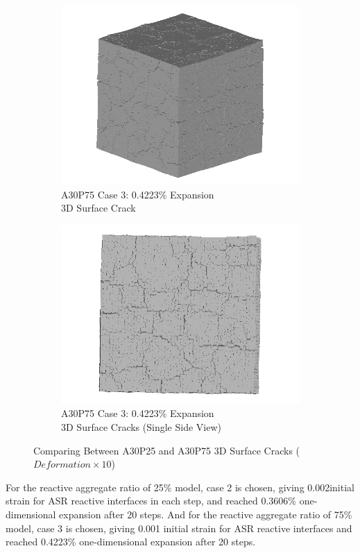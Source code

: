 \begin{figure}[ht!]
\begin{subfigure}{.5\textwidth}
    \end{subfigure}
    \begin{subfigure}{.5\textwidth}
      \centering
      \includegraphics[width=.8\linewidth]{Files/exp_3D/ASR/A30P75_3_3d.png}
    \caption{A30P75 Case 3: 0.4223\% Expansion\\ 3D Surface Crack}
    \end{subfigure}%
    \begin{subfigure}{.5\textwidth}
      \centering
      \includegraphics[width=.8\linewidth]{Files/exp_3D/ASR/A30P75_3_3ds.png}
    \caption{A30P75 Case 3: 0.4223\% Expansion\\ 3D Surface Cracks (Single Side View)}
    \end{subfigure}

  \caption{Comparing Between A30P25 and A30P75 3D Surface Cracks ($Deformation \times 10$)}
  \label{fig:ASR_A30P25vsA30P75_3D}
\end{figure}


For the reactive aggregate ratio of 25\% model, case 2 is chosen, giving 0.002initial strain for ASR reactive interfaces in each step, and reached 0.3606\% one-dimensional expansion after 20 steps. And for the reactive aggregate ratio of 75\% model, case 3 is chosen, giving 0.001 initial strain for ASR reactive interfaces and reached 0.4223\% one-dimensional expansion after 20 steps.

